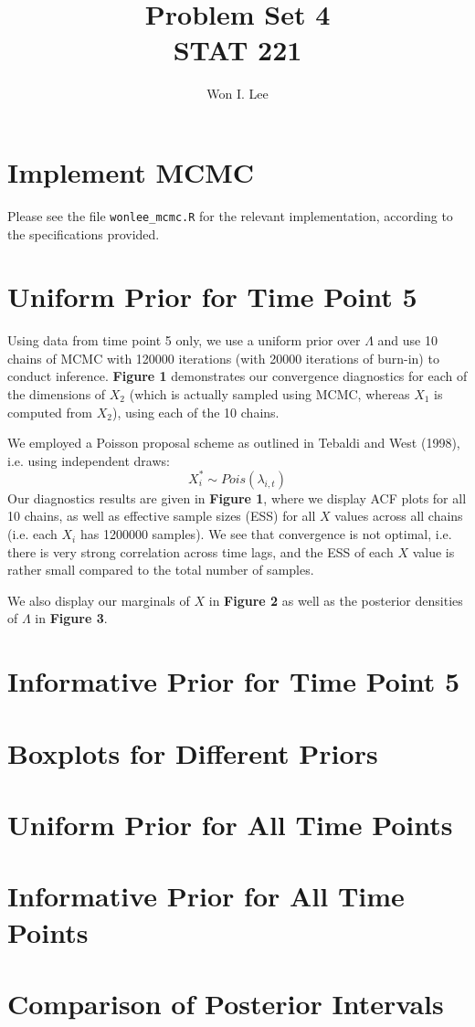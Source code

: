 \documentclass[psamsfonts]{amsart}
\title{Problem Set 4 \\ STAT 221}
\author{Won I. Lee}
\theoremstyle{definition}
\theoremstyle{remark}
\numberwithin{equation}{section}
\begin{document}
	
\maketitle

\section{Implement MCMC}

Please see the file \texttt{wonlee\_mcmc.R} for the relevant implementation, according to the specifications provided.

\section{Uniform Prior for Time Point 5}

Using data from time point 5 only, we use a uniform prior over $\Lambda$ and use 10 chains of MCMC with 120000 iterations (with 20000 iterations of burn-in) to conduct inference. {\bf Figure 1} demonstrates our convergence diagnostics for each of the dimensions of $X_2$ (which is actually sampled using MCMC, whereas $X_1$ is computed from $X_2$), using each of the 10 chains.

We employed a Poisson proposal scheme as outlined in Tebaldi and West (1998), i.e. using independent draws:
$$X_i^* \sim Pois(\lambda_{i,t})$$
Our diagnostics results are given in {\bf Figure 1}, where we display ACF plots for all 10 chains, as well as effective sample sizes (ESS) for all $X$ values across all chains (i.e. each $X_i$ has 1200000 samples). We see that convergence is not optimal, i.e. there is very strong correlation across time lags, and the ESS of each $X$ value is rather small compared to the total number of samples.

We also display our marginals of $X$ in {\bf Figure 2} as well as the posterior densities of $\Lambda$ in {\bf Figure 3}. 

\section{Informative Prior for Time Point 5}



\section{Boxplots for Different Priors}

\section{Uniform Prior for All Time Points}

\section{Informative Prior for All Time Points}

\section{Comparison of Posterior Intervals}
\end{document}
